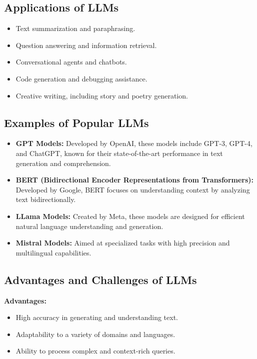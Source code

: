 \subsection{Applications of LLMs}

\begin{itemize}
\item Text summarization and paraphrasing.
\item Question answering and information retrieval.
\item Conversational agents and chatbots.
\item Code generation and debugging assistance.
\item Creative writing, including story and poetry generation.
\end{itemize}

\subsection{Examples of Popular LLMs}

\begin{itemize}
\item \textbf{GPT Models:} Developed by OpenAI, these models include GPT-3, GPT-4, and ChatGPT, known for their state-of-the-art performance in text generation and comprehension.
\item \textbf{BERT (Bidirectional Encoder Representations from Transformers):} Developed by Google, BERT focuses on understanding context by analyzing text bidirectionally.
\item \textbf{LLama Models:} Created by Meta, these models are designed for efficient natural language understanding and generation.
\item \textbf{Mistral Models:} Aimed at specialized tasks with high precision and multilingual capabilities.
\end{itemize}

\subsection{Advantages and Challenges of LLMs}

\textbf{Advantages:}
\begin{itemize}
\item High accuracy in generating and understanding text.
\item Adaptability to a variety of domains and languages.
\item Ability to process complex and context-rich queries.
\end{itemize}

